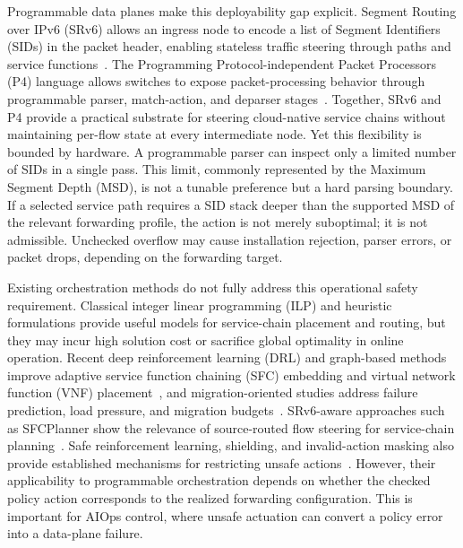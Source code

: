 \documentclass[final,5p]{elsarticle}
\newcommand{\rev}[1]{\textcolor{revisiongreen}{#1}}
\let\newrev\rev
\begin{document}
Programmable data planes make this deployability gap explicit. \newrev{Segment Routing over IPv6 (SRv6) allows an ingress node to encode a list of Segment Identifiers (SIDs) in the packet header, enabling stateless traffic steering through paths and service functions~\cite{filsfils2015segment,rfc8986,rfc9352}.} \newrev{The Programming Protocol-independent Packet Processors (P4) language allows switches to expose packet-processing behavior through programmable parser, match-action, and deparser stages~\cite{jeyakumar2014p4}.} Together, SRv6 and P4 provide a practical substrate for steering cloud-native service chains without maintaining per-flow state at every intermediate node. Yet this flexibility is bounded by hardware. A programmable parser can inspect only a limited number of SIDs in a single pass. This limit, commonly represented by the Maximum Segment Depth (MSD), is not a tunable preference but a hard parsing boundary. If a selected service path requires a SID stack deeper than the supported MSD of the relevant forwarding profile, the action is not merely suboptimal; it is not admissible. \rev{Unchecked overflow may cause installation rejection, parser errors, or packet drops, depending on the forwarding target.}

Existing orchestration methods do not fully address this operational safety requirement. Classical \rev{integer linear programming (ILP)} and heuristic formulations provide useful models for service-chain placement and routing, but they \rev{may incur high solution cost or sacrifice global optimality in online operation}. Recent \rev{deep reinforcement learning (DRL)} and graph-based methods improve adaptive \rev{service function chaining (SFC)} embedding and \rev{virtual network function (VNF)} placement~\cite{wang2021drl,xiao2023twostage,liu2024sfcml,taktak2024drl,wu2025drl}, and migration-oriented studies address failure prediction, load pressure, and migration budgets~\cite{zhai2023migration,addad2022ai,qin2023sfcmigrationbudget,afrasiabi2024cluster,zhang2025sfcmigration,hu2026rlpmo}. SRv6-aware approaches such as SFCPlanner show the relevance of source-routed flow steering for service-chain planning~\cite{qiu2024sfcplanner}. \rev{Safe reinforcement learning, shielding, and invalid-action masking also provide established mechanisms for restricting unsafe actions~\cite{gu2024safe,wachi2024constraint,huang2022closer}. However, their applicability to programmable orchestration depends on whether the checked policy action corresponds to the realized forwarding configuration.} This is \rev{important} for AIOps control, where unsafe actuation can convert a policy error into a data-plane failure.
\end{document}
